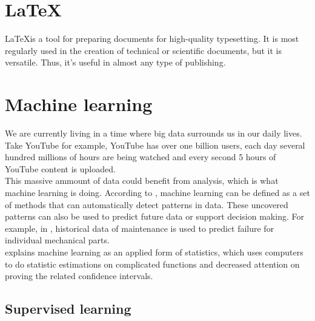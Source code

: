 \section{\LaTeX}

\LaTeX is a tool for preparing documents for high-quality typesetting. It is most regularly used in the creation of technical or scientific documents, but it is versatile. Thus, it's useful in almost any type of publishing.\parencite{_introduction_2018} \\ %



\section{Machine learning}
% 

We are currently living in a time where big data surrounds us in our daily lives. Take YouTube for example, YouTube has over one billion users, each day several hundred millions of hours are being watched and every second 5 hours of YouTube content is uploaded. \\ %
 This massive ammount of data could benefit from analysis, which is what machine learning is doing. According to \cite{murphy_machine_2012}, machine learning can be defined as a set of methods that can automatically detect patterns in data. These uncovered patterns can also be used to predict future data or support decision making. For example, in \cite{cline_predictive_2017}, historical data of maintenance is used to predict failure for individual mechanical parts. \\
\cite{goodfellow_deep_2016} explains machine learning as an applied form of statistics, which uses computers to do statistic estimations on complicated functions and decreased attention on proving the related confidence intervals. 


\subsection{Supervised learning}
% 

